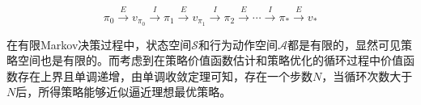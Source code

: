 \begin{equation}
\pi_0 \xrightarrow{E} v_{\pi_0} \xrightarrow{I}\pi_1 \xrightarrow{E} v_{\pi_1} \xrightarrow{I} \pi_2 \xrightarrow{E} \cdots \xrightarrow{I} \pi_* \xrightarrow{E} v_*
\end{equation}

在有限Markov决策过程中，状态空间$\mathcal{S}$和行为动作空间$\mathcal{A}$都是有限的，显然可见策略空间也是有限的。而考虑到在策略价值函数估计和策略优化的循环过程中价值函数存在上界且单调递增，由单调收敛定理可知，存在一个步数$N$，当循环次数大于$N$后，所得策略能够近似逼近理想最优策略。


















